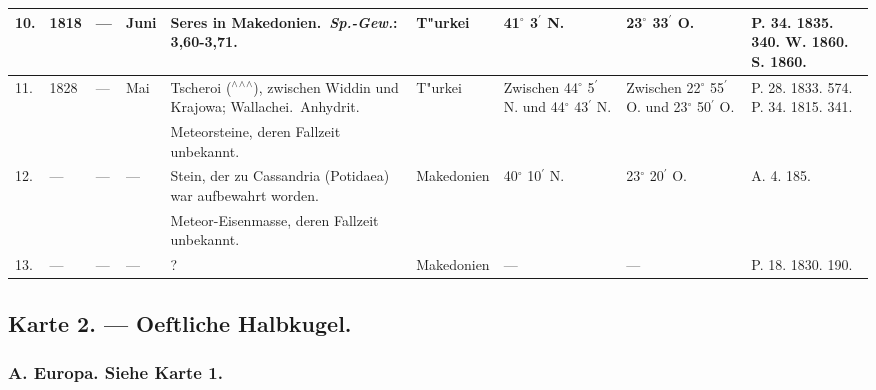 \documentclass[a4paper, 8pt, oneside, polutonikogreek, german]{article}
\begin{document}
\begin{center}
\begin{longtable}{|p{3mm}|p{12mm}|p{5mm}|p{13mm}|p{25mm}|p{15mm}|p{10mm}|p{10mm}|p{11mm}|}
        10. & 1818 & --- & Juni & Seres in Makedonien. \emph{Sp.-Gew.}: 3,60-3,71. & T"urkei & 41$^\circ$ 3$^\prime$ N. & 23$^\circ$ 33$^\prime$ O. & P. 34. 1835. 340. W. 1860. S. 1860. \\ \hline
        11. & 1828 & --- & Mai & Tscheroi ($^\wedge$$^\wedge$$^\wedge$), zwischen Widdin und Krajowa; Wallachei. Anhydrit. & T"urkei & Zwischen 44$^\circ$ 5$^\prime$ N. und 44$^\circ$ 43$^\prime$ N. & Zwischen 22$^\circ$ 55$^\prime$ O. und 23$^\circ$ 50$^\prime$ O. & P. 28. 1833. 574. P. 34. 1815. 341. \\ \hline
          &   &   &   & Meteorsteine, deren Fallzeit unbekannt. &   &   &   &   \\ \hline
        12. & --- & --- & --- & Stein, der zu Cassandria (Potidaea) war aufbewahrt worden. & Makedonien & 40$^\circ$ 10$^\prime$ N. & 23$^\circ$ 20$^\prime$ O. & A. 4. 185. \\ \hline
          &   &   &   & Meteor-Eisenmasse, deren Fallzeit unbekannt. &   &   &   &   \\ \hline
        13. & --- & --- & --- & ? & Makedonien & --- & --- & P. 18. 1830. 190. \\ \hline
    \end{longtable}
\end{center}
\clearpage
\subsection{Karte 2. --- Oeftliche Halbkugel.}
\subsubsection{A. Europa. Siehe Karte 1.}
\end{document}
